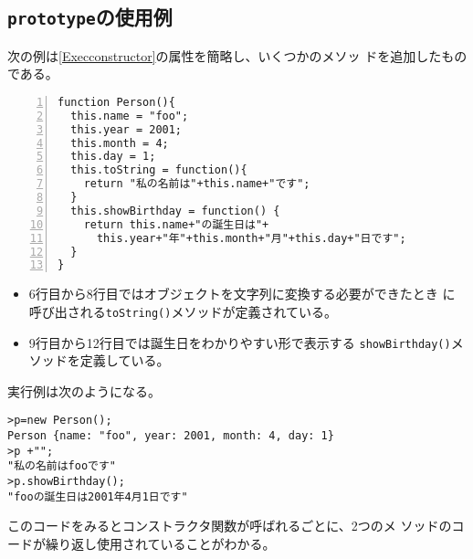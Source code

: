  \subsection{\protect\texttt{prototype}の使用例}
 \begin{Exec}\upshape\label{ExecConst2}
  次の例は\ref{Execconstructor}の属性を簡略し、いくつかのメソッ
 ドを追加したものである。
\begin{Verbatim}[numbers=left]
function Person(){
  this.name = "foo";
  this.year = 2001;
  this.month = 4;
  this.day = 1;
  this.toString = function(){
    return "私の名前は"+this.name+"です";
  }
  this.showBirthday = function() {
    return this.name+"の誕生日は"+
      this.year+"年"+this.month+"月"+this.day+"日です";
  }
}
\end{Verbatim}
 \end{Exec}
 \begin{itemize}
  \item 6行目から8行目ではオブジェクトを文字列に変換する必要ができたとき
        に呼び出される\texttt{toString()}メソッドが定義されている。
  \item 9行目から12行目では誕生日をわかりやすい形で表示する
        \texttt{showBirthday()}メソッドを定義している。
 \end{itemize}
実行例は次のようになる。
 \begin{Verbatim}
>p=new Person();
Person {name: "foo", year: 2001, month: 4, day: 1}
>p +"";
"私の名前はfooです"
>p.showBirthday();
"fooの誕生日は2001年4月1日です"
 \end{Verbatim}
 このコードをみるとコンストラクタ関数が呼ばれるごとに、2つのメ
 ソッドのコードが繰り返し使用されていることがわかる。

